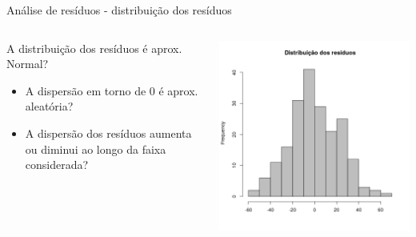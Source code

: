 \documentclass{beamer}
\begin{document}
\begin{frame}{\footnotesize Análise de resíduos - distribuição dos resíduos}
  \begin{columns}
    \begin{column}{5cm}
      A distribuição dos resíduos é aprox. Normal?
      \bigskip
      \begin{itemize}
        \footnotesize
      \item A dispersão em torno de 0 é aprox. aleatória?
        \bigskip
      \item A dispersão dos resíduos aumenta ou diminui ao longo da faixa considerada?
      \end{itemize}
    \end{column}
    \begin{column}{5cm}
      \begin{center}
        \includegraphics[width=1.1\textwidth]{Cap18-19/pratica-rls-resid-hist}
      \end{center}
    \end{column}
  \end{columns}
\end{frame}
\end{document}
